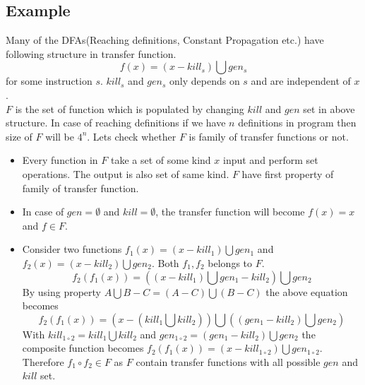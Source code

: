 \subsection{Example}
Many of the DFAs(Reaching definitions, Constant Propagation etc.) have following structure in transfer function.
\[f(x) = (x-kill_{s})\bigcup gen_{s}\] for some instruction $s$. $kill_{s}$ and $gen_{s}$ only depends on $s$ and are independent of $x$.
\\$F$ is the set of function which is populated by changing $kill$ and $gen$ set in above structure.
In case of reaching definitions if we have $n$ definitions in program then size of $F$ will be $4^{n}$.  Lets check whether $F$ is family of transfer functions or not.
\begin{itemize}
    \item Every function in $F$ take a set of some kind $x$ input and perform set operations. The output is also set of same kind. $F$ have first property of family of transfer function.
    \item In case of $gen = \emptyset$ and $kill = \emptyset$, the transfer function will become $f(x) = x$ and $f\in F$.
    \item Consider two functions $f_{1}(x) = (x-kill_{1})\bigcup gen_{1}$ and $f_{2}(x) = (x-kill_{2})\bigcup gen_{2}$. Both $f_{1}, f_{2}$ belongs to $F$. 
    \[f_{2}(f_{1}(x)) = ((x-kill_{1})\bigcup gen_{1}-kill_{2})\bigcup gen_{2}\]
    By using property $A\bigcup B - C = (A-C)\bigcup (B-C)$ the above equation becomes
    \[f_{2}(f_{1}(x)) = (x-(kill_{1} \bigcup kill_{2}))\bigcup ((gen_{1}-kill_{2})\bigcup gen_{2})\]
    With $kill_{1\circ 2} = kill_{1} \bigcup kill_{2}$ and $gen_{1\circ 2} = (gen_{1}-kill_{2})\bigcup gen_{2}$ the composite function becomes $f_{2}(f_{1}(x)) = (x - kill_{1 \circ 2})\bigcup gen_{1\circ 2}$. Therefore $f_{1} \circ f_{2} \in F$ as $F$ contain transfer functions with all possible $gen$ and $kill$ set. 
\end{itemize}
